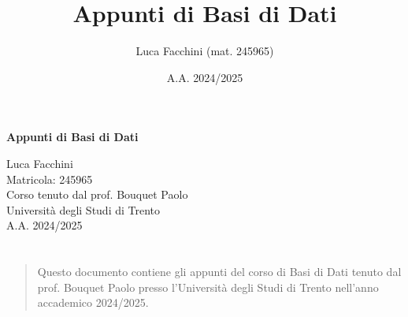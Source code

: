 \documentclass[twoside]{report}
\title{Appunti di Basi di Dati}
\author{Luca Facchini (mat. 245965)}
\date{A.A. 2024/2025}
\makeatletter
\renewenvironment{abstract}{%
    \if@twocolumn
        \section*{\abstractname}%
    \else
        \begin{center}%
            {\bfseries \abstractname\vspace{-.5em}\vspace{\z@}}%
        \end{center}%
        \small
        \begin{quotation}
    \fi}
    {\if@twocolumn\else\end{quotation}\fi}
\makeatother
\begin{document}
    \begin{titlepage}
        \centering  %
        {\Huge\textbf{Appunti di Basi di Dati}} \\[1cm] %
        \vspace{0.5cm}
        
        {\Large Luca Facchini} \\ %
        \vspace{0.3cm}
        {\large Matricola: 245965} \\[2cm] %
        
        {\large Corso tenuto dal prof. Bouquet Paolo} \\[0.3cm] %
        {\large Università degli Studi di Trento} \\[1.5cm]
        
        {\large A.A. 2024/2025} \\[3cm] %
        
        \vfill
        \begin{abstract}
            Questo documento contiene gli appunti del corso di Basi di Dati tenuto dal prof. Bouquet Paolo presso l'Università degli Studi di Trento nell'anno accademico 2024/2025.
        \end{abstract}
        
        \vfill  %
    \end{titlepage}
    \tableofcontents

    \pagestyle{fancy}
    \fancyhead{}
    \fancyhead[RO,LE]{\leftmark}
    \fancyfoot{}
    \fancyfoot[LE,RO]{\thepage}

    
    
    
\end{document}
